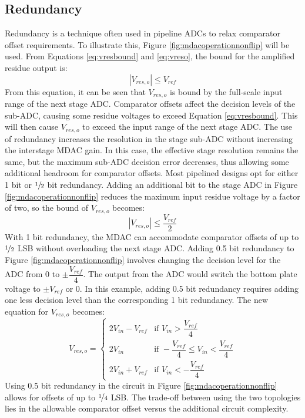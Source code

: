  \subsection{Redundancy}
\label{sec:redundancy} 
Redundancy is a technique often used in pipeline ADCs to relax comparator offset requirements. To illustrate this, Figure \ref{fig:mdacoperationnonflip} will be used. From Equations \ref{eq:vresbound} and \ref{eq:vreso}, the bound for the amplified residue output is:
\begin{equation}
\label{vresobound}
|V_{res,o}| \leq V_{ref}
\end{equation}
From this equation, it can be seen that $V_{res,o}$ is bound by the full-scale input range of the next stage ADC. Comparator offsets affect the decision levels of the sub-ADC, causing some residue voltages to exceed Equation 
\ref{eq:vresbound}. This will then cause $V_{res,o}$ to exceed the input range of the next stage ADC. The use of redundancy increases the resolution in the stage sub-ADC without increasing the interstage MDAC gain. In this 
case, the effective stage resolution remains the same, but the maximum sub-ADC decision error decreases, thus allowing some additional headroom for comparator offsets. Most pipelined designs opt for either 1 bit or $\sfrac{1}{2
}$ bit redundancy. Adding an additional bit to the stage ADC in Figure \ref{fig:mdacoperationnonflip} reduces the maximum input residue voltage by a factor of two, so the bound of $V_{res,o}$ becomes:
\begin{equation}
\label{vresoboundonebitredundancy}
|V_{res,o}| \leq \dfrac{V_{ref}}{2}
\end{equation}
With 1 bit redundancy, the MDAC can accommodate comparator offsets of up to $\nicefrac{1}{2}$ LSB without overloading the next stage ADC. Adding 0.5 bit redundancy to Figure \ref{fig:mdacoperationnonflip} involves changing the 
decision level for the ADC from $0$ to $\pm\dfrac{V_{ref}}{4}$. The output from the ADC would switch the bottom plate voltage to $\pm V_{ref}$ or $0$. In this example, adding 0.5 bit redundancy requires adding one less 
decision level than the corresponding 1 bit redundancy. The new equation for $V_{res,o}$ becomes:
\begin{equation}
\label{vresohalfbitredundancy}
V_{res,o}=	
	\begin{cases}
		2V_{in}-V_{ref} & \mbox{if } V_{in} > \dfrac{V_{ref}}{4} \\
		2V_{in} 		& \mbox{if } -\dfrac{V_{ref}}{4} \leq V_{in} < \dfrac{V_{ref}}{4} \\
		2V_{in}+V_{ref} & \mbox{if } V_{in} <  -\dfrac{V_{ref}}{4}
	\end{cases}
\end{equation} 
Using 0.5 bit redundancy in the circuit in Figure \ref{fig:mdacoperationnonflip} allows for offsets of up to $\nicefrac{1}{4}$ LSB. The trade-off between using the two topologies lies in the allowable comparator offset versus the additional circuit complexity.
